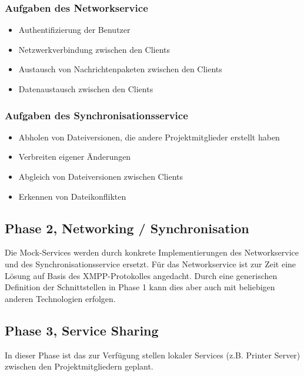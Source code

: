 \subsubsection{Aufgaben des Networkservice}
\begin{itemize}
\item Authentifizierung der Benutzer
\item Netzwerkverbindung zwischen den Clients
\item Austausch von Nachrichtenpaketen zwischen den Clients
\item Datenaustausch zwischen den Clients
\end{itemize}
\subsubsection{Aufgaben des Synchronisationsservice}
\begin{itemize}
\item Abholen von Dateiversionen, die andere Projektmitglieder erstellt haben
\item Verbreiten eigener Änderungen
\item Abgleich von Dateiversionen zwischen Clients
\item Erkennen von Dateikonflikten
\end{itemize}
\subsection{Phase 2, Networking / Synchronisation}
Die Mock-Services werden durch konkrete Implementierungen des Networkservice und des Synchronisationsservice ersetzt. Für das Networkservice ist zur Zeit eine Lösung auf Basis des XMPP-Protokolles angedacht. Durch eine generischen Definition der Schnittstellen in Phase 1 kann dies aber auch mit beliebigen anderen Technologien erfolgen.
\subsection{Phase 3, Service Sharing}
In dieser Phase ist das zur Verfügung stellen lokaler Services (z.B. Printer Server) zwischen den Projektmitgliedern geplant.



